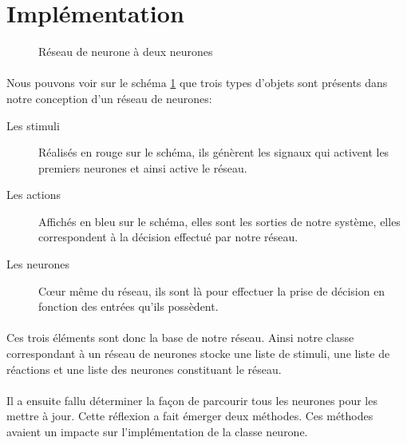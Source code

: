 \section{Implémentation}

\begin{figure}[ht]
  \centering
  
  \caption{Réseau de neurone à deux neurones}
  \label{graphInit}
\end{figure}

\paragraph{}
Nous pouvons voir sur le schéma \ref{graphInit} que trois types d'objets sont
présents dans notre conception d'un réseau de neurones:\\
\begin{description}
  \item[Les stimuli] Réalisés en rouge sur le schéma, ils génèrent les signaux
    qui activent les premiers neurones et ainsi active le réseau.
  \item[Les actions] Affichés en bleu sur le schéma, elles sont les sorties de
    notre système, elles correspondent à la décision effectué par notre réseau.
  \item[Les neurones] Cœur même du réseau, ils sont là pour effectuer la prise
    de décision en fonction des entrées qu'ils possèdent.
\end{description}

\paragraph{}
Ces trois éléments sont donc la base de notre réseau. Ainsi notre classe correspondant
à un réseau de neurones stocke une liste de stimuli, une liste de réactions et une
liste des neurones constituant le réseau.

\paragraph{}
Il a ensuite fallu déterminer la façon de parcourir tous les neurones pour les
mettre à jour. Cette réflexion a fait émerger deux méthodes. Ces méthodes
avaient un impacte sur l'implémentation de la classe neurone. \\


